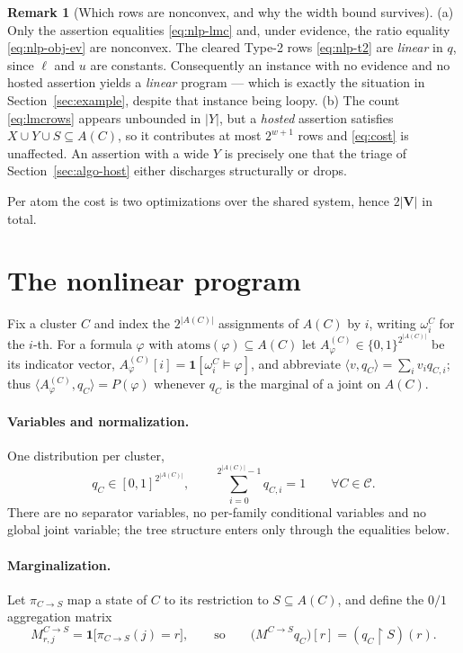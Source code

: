 \documentclass[11pt]{article}
\theoremstyle{definition}
\newtheorem{remark}{Remark}
\newcommand{\atoms}{\mathrm{atoms}}
\newcommand{\restr}{\!\restriction\!}
\begin{document}
\begin{remark}[Which rows are nonconvex, and why the width bound survives]\label{rem:counting}
(a) Only the assertion equalities \eqref{eq:nlp-lmc} and, under evidence, the
ratio equality \eqref{eq:nlp-obj-ev} are nonconvex. The cleared Type-2 rows
\eqref{eq:nlp-t2} are \emph{linear} in $q$, since $\ell$ and $u$ are constants.
Consequently an instance with no evidence and no hosted assertion yields a
\emph{linear} program --- which is exactly the situation in
Section~\ref{sec:example}, despite that instance being loopy.
(b) The count \eqref{eq:lmcrows} appears unbounded in $|Y|$, but a \emph{hosted}
assertion satisfies $X\cup Y\cup S\subseteq A(C)$, so it contributes at most
$2^{w+1}$ rows and \eqref{eq:cost} is unaffected. An assertion with a wide $Y$ is
precisely one that the triage of Section~\ref{sec:algo-host} either discharges
structurally or drops.
\end{remark}

Per atom the cost is two optimizations over the shared system, hence $2|\mathbf V|$
in total.

\section{The nonlinear program}\label{sec:nlp}

Fix a cluster $C$ and index the $2^{|A(C)|}$ assignments of $A(C)$ by
$i$, writing $\omega^C_i$ for the $i$-th. For a formula $\varphi$ with
$\atoms(\varphi)\subseteq A(C)$ let $A^{(C)}_\varphi\in\{0,1\}^{2^{|A(C)|}}$ be
its indicator vector, $A^{(C)}_\varphi[i]=\mathbf 1[\omega^C_i\models\varphi]$,
and abbreviate $\langle v,q_C\rangle=\sum_i v_iq_{C,i}$; thus
$\langle A^{(C)}_\varphi,q_C\rangle=P(\varphi)$ whenever $q_C$ is the marginal of
a joint on $A(C)$.

\paragraph{Variables and normalization.}
One distribution per cluster,
\begin{equation}\label{eq:nlp-var}
  q_C\in[0,1]^{2^{|A(C)|}},\qquad
  \sum_{i=0}^{2^{|A(C)|}-1}q_{C,i}=1
  \qquad\forall C\in\mathcal C .
\end{equation}
There are no separator variables, no per-family conditional variables and no
global joint variable; the tree structure enters only through the equalities
below.

\paragraph{Marginalization.}
Let $\pi_{C\to S}$ map a state of $C$ to its restriction to $S\subseteq A(C)$,
and define the $0/1$ aggregation matrix
\begin{equation}\label{eq:nlp-M}
  M^{C\to S}_{r,j}=\mathbf 1\bigl[\pi_{C\to S}(j)=r\bigr],
  \qquad\text{so}\qquad
  \bigl(M^{C\to S}q_C\bigr)[r]=(q_C\restr S)(r).
\end{equation}
\end{document}
